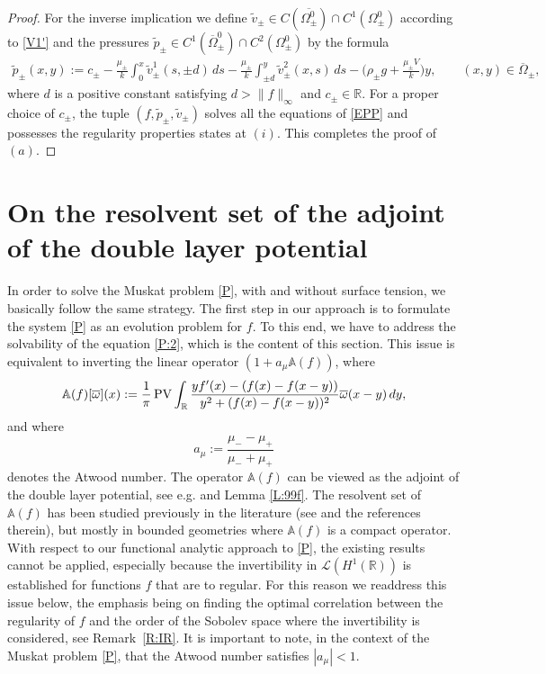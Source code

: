 \documentclass[11pt,reqno]{amsart}
\numberwithin{equation}{section}
\newcommand{\PV}{\mathop{\rm PV}\nolimits}
\newcommand{\0}{\Omega}
\newcommand{\wt}{\widetilde}
\newcommand{\ov}{\overline}
\newcommand{\bA}{\mathbb{A}}
\newcommand{\kL}{\mathcal{L}}
\newcommand{\R}{\mathbb{R}}
\numberwithin{equation}{section}
\begin{document}
\begin{proof}
For the inverse implication  we define $\wt v_\pm\in C(\ov{\0_\pm^0})\cap C^1({\0_\pm^0})$ according to \eqref{V1'} and  the pressures $\wt p_\pm\in C^1(\ov\0_\pm^0)\cap C^2(\0_\pm^0)$  by the formula
\begin{align*} 
\wt p_\pm(x,y):=c_\pm-\frac{\mu_\pm}{k}\int_0^x \wt v_\pm^1(s,\pm d)\, ds-\frac{\mu_\pm}{k}\int_{\pm d}^y \wt v_\pm^2(x,s)\, ds-\Big(\rho_\pm g+\frac{\mu_\pm V}{k}\Big)y, \qquad (x,y)\in\ov\0_\pm,
\end{align*}
where $d$ is a positive constant satisfying  $d>\|f\|_ \infty$ and $c_\pm\in\R$. 
For a proper choice of $c_\pm$,  the tuple $(f,\wt p_\pm,\wt v_\pm)$ solves all the equations of \eqref{EPP} and  possesses the regularity properties states at $(i)$.
This  completes the proof of $(a)$.
\end{proof}











\section{On the resolvent set of the adjoint of the double layer potential}\label{Sec2}


In order to solve the Muskat problem \eqref{P}, with and without surface tension, we basically follow the same strategy. The  first step in our approach is to formulate  the system \eqref{P} as an evolution problem for $f$. 
To this end, we have to address the solvability of the equation \eqref{P:2}, which is the content of this section.
This issue is equivalent to   inverting the linear operator   $(1+a_\mu\bA(f))$, where
\begin{align}\label{DL1}
 \bA(f)[\ov\omega](x):=\frac{1}{\pi}\PV\int_\R\frac{ yf'(x)-(f(x)-f(x-y)) }{ y^2+(f(x)-f(x-y))^2 }\ov\omega(x-y)\, dy, 
\end{align}
and where
\[
a_\mu:= \frac{\mu_--\mu_+}{ \mu_-+\mu_+}
\]
denotes the Atwood number.
The operator $\bA(f)$  can be viewed as  the adjoint of the double layer potential, see e.g. \cite{FJR78, Ve84} and Lemma \ref{L:99f}. 
The resolvent set of $\bA(f)$ has been studied previously 
 in the literature (see \cite{FJR78, Ve84, CM97, CCG11, CCG13b} and the references therein), but mostly in bounded geometries where $\bA(f)$ 
 is a compact operator. 
 With respect to our functional analytic approach to \eqref{P}, the existing results cannot be applied, especially because the invertibility  in $\kL(H^1(\R))$ is established for functions  $f$ that are to regular.
For this reason we readdress this issue below, the emphasis being on finding the optimal correlation between the regularity of $f$ and the order of the  Sobolev space where the invertibility is considered, see Remark~\ref{R:IR}.
It is important to note, in the context of the Muskat problem \eqref{P}, that the Atwood number satisfies $|a_\mu|<1.$
  \medskip
\end{document}
